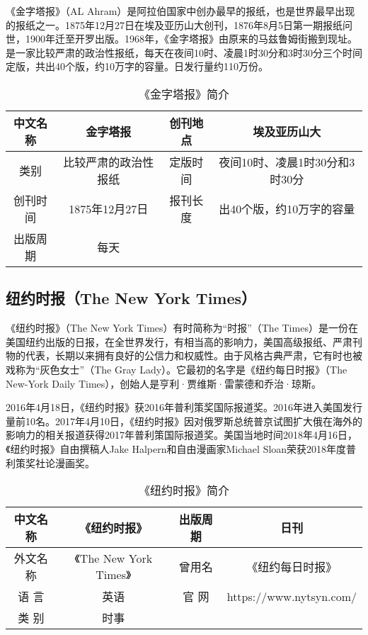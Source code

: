 \documentclass[a4paper,openany]{book}
\begin{document}
《金字塔报》（AL Ahram）是阿拉伯国家中创办最早的报纸，也是世界最早出现的报纸之一。1875年12月27日在埃及亚历山大创刊，1876年8月5日第一期报纸问世，1900年迁至开罗出版。1968年，《金字塔报》由原来的马兹鲁姆街搬到现址。是一家比较严肃的政治性报纸，每天在夜间10时、凌晨1时30分和3时30分三个时间定版，共出40个版，约10万字的容量。日发行量约110万份。

\begin{table}[ht]
\setlength{\belowcaptionskip}{5pt}
\centering
\caption{《金字塔报》简介}
\begin{tabular}{|c|c|c|c|}
\hline
中文名称 & 金字塔报        & 创刊地点 & 埃及亚历山大              \\ \hline
类别   & 比较严肃的政治性报纸  & 定版时间 & 夜间10时、凌晨1时30分和3时30分 \\ \hline
创刊时间 & 1875年12月27日 & 报刊长度 & 出40个版，约10万字的容量      \\ \hline
出版周期 & 每天          &      &                     \\ \hline
\end{tabular}
\end{table}

\subsection{纽约时报（The New York Times）}

《纽约时报》（The New York Times）有时简称为“时报”（The Times）是一份在美国纽约出版的日报，在全世界发行，有相当高的影响力，美国高级报纸、严肃刊物的代表，长期以来拥有良好的公信力和权威性。由于风格古典严肃，它有时也被戏称为“灰色女士”（The Gray Lady）。它最初的名字是《纽约每日时报》（The New-York Daily Times），创始人是亨利·贾维斯·雷蒙德和乔治·琼斯。

2016年4月18日，《纽约时报》获2016年普利策奖国际报道奖。2016年进入美国发行量前10名。2017年4月10日，《纽约时报》因对俄罗斯总统普京试图扩大俄在海外的影响力的相关报道获得2017年普利策国际报道奖。美国当地时间2018年4月16日，《纽约时报》自由撰稿人Jake Halpern和自由漫画家Michael Sloan荣获2018年度普利策奖社论漫画奖。

\begin{table}[ht]
\centering
\setlength{\belowcaptionskip}{5pt}
\caption{《纽约时报》简介}
\begin{tabular}{|c|c|c|c|}
\hline
中文名称   & 《纽约时报》               & 出版周期   & 日刊                      \\ \hline
外文名称   & 《The New York Times》 & 曾用名    & 《纽约每日时报》                \\ \hline
语    言 & 英语                   & 官    网 & https://www.nytsyn.com/ \\ \hline
类    别 & 时事                   &        &                         \\ \hline
\end{tabular}
\end{table}
\end{document}
